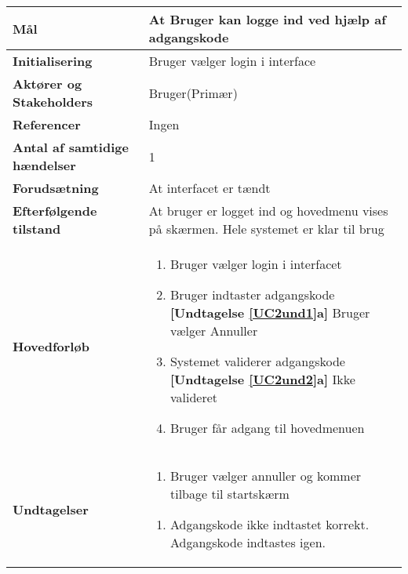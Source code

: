 \begin{table}[H] \centering
\begin{tabular}{|p{6cm}|p{8cm}|}
	\hline
\textbf{Mål}								
&At Bruger kan logge ind ved hjælp af adgangskode
 \\\hline
\textbf{Initialisering}					
&Bruger vælger login i interface
 \\\hline
\textbf{Aktører og Stakeholders}			
&Bruger(Primær)
 \\\hline
\textbf{Referencer}						
&Ingen
 \\\hline
\textbf{Antal af samtidige hændelser}	
&1
 \\\hline
\textbf{Forudsætning}					
&At interfacet er tændt
 \\\hline
\textbf{Efterfølgende tilstand}			
&At bruger er logget ind og hovedmenu vises på skærmen. Hele systemet er klar til brug
 \\\hline
\textbf{Hovedforløb}						
& 
\begin{enumerate}

\item Bruger vælger login i interfacet

\item \label{UC2und1}Bruger indtaster adgangskode \newline
\textbf{[Undtagelse \ref{UC2und1}a]} Bruger vælger Annuller

\item \label{UC2und2} Systemet validerer adgangskode \newline
\textbf{[Undtagelse \ref{UC2und2}a]} Ikke valideret

\item Bruger får adgang til hovedmenuen	
 
\end{enumerate}
\\\hline

\textbf{Undtagelser}						
&\begin{enumerate}[label= \ref{UC2und1}a.]
			\item Bruger vælger annuller og kommer tilbage til startskærm
		\end{enumerate}
											
		\begin{enumerate}[label= \ref{UC2und2}a.]
			\item Adgangskode ikke indtastet korrekt. Adgangskode indtastes igen.
		\end{enumerate} \\\hline


	\end{tabular}
	\label{UC1} 
\end{table}